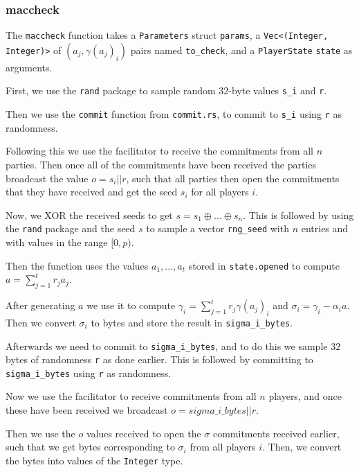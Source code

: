 \documentclass[../main.tex]{subfiles}
\begin{document}
\subsubsection{maccheck}
The \lstinline{maccheck} function takes a \lstinline{Parameters} struct \lstinline{params}, a \lstinline{Vec<(Integer, Integer)>} of $(a_j, \gamma(a_j)_i)$ pairs named \lstinline{to_check}, and a \lstinline{PlayerState} \lstinline{state} as arguments.

First, we use the \lstinline{rand} package to sample random $32$-byte values  \lstinline{s_i} and \lstinline{r}.

Then we use the \lstinline{commit} function from \lstinline{commit.rs}, to commit to \lstinline{s_i} using \lstinline{r} as randomness.

Following this we use the facilitator to receive the commitments from all $n$ parties. Then once all of the commitments have been received the parties broadcast the value $o = s_i || r$, such that all parties then open the commitments that they have received and get the seed $s_i$ for all players $i$.

Now, we XOR the received seeds to get $s = s_1 \oplus ... \oplus s_n$. This is followed by using the \lstinline{rand} package and the seed $s$ to sample a vector \lstinline{rng_seed} with $n$ entries and with values in the range $[0, p)$.

Then the function uses the values $a_1, ..., a_t$ stored in \lstinline{state.opened} to compute $a = \sum^t_{j = 1} r_j a_j$. %

After generating $a$ we use it to compute $\gamma_i = \sum^t_{j = 1} r_j \gamma(a_j)_i$ and $\sigma_i = \gamma_i - \alpha_i a$. Then we convert $\sigma_i$ to bytes and store the result in \lstinline{sigma_i_bytes}.

Afterwards we need to commit to \lstinline{sigma_i_bytes}, and to do this we sample $32$ bytes of randomness \lstinline{r} as done earlier. This is followed by committing to \lstinline{sigma_i_bytes} using \lstinline{r} as randomness.

Now we use the facilitator to receive commitments from all $n$ players, and once these have been received we broadcast $o = sigma\_i\_bytes || r$.

Then we use the $o$ values received to open the $\sigma$ commitments received earlier, such that we get bytes corresponding to $\sigma_i$ from all players $i$. Then, we convert the bytes into values of the \lstinline{Integer} type.
\end{document}
